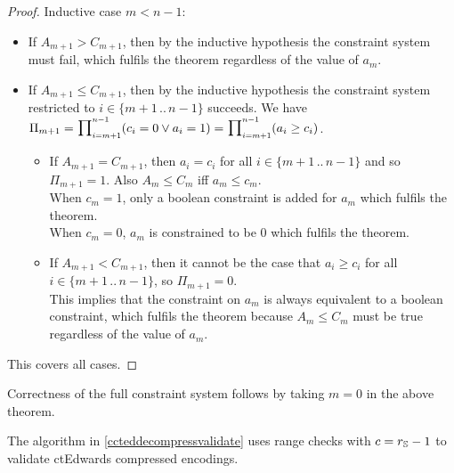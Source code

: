 \documentclass{article}
\newcommand{\crossref}[1]{\autoref{#1}}
\newcommand{\setof}[1]{\{{#1}\}}
\newcommand{\barerange}[2]{{{#1}\,..\,{#2}}}
\newcommand{\range}[2]{\setof{\barerange{#1}{#2}}}
\newcommand{\sop}[3]{\!\scalebox{0.89}{$\scalebox{1.404}{$\strut#3$}_{#1}^{#2}$}}
\newcommand{\sproduct}[2]{\sop{#1}{#2}{\prod}}
\newcommand{\ParamS}[1]{{{#1}_\mathbb{\hskip 0.03em S}}}
\begin{document}
\begin{proof}
Inductive case $m < n-1$:
\begin{itemize}
  \item If $A_{m+1} > C_{m+1}$, then by the inductive hypothesis the constraint system
        must fail, which fulfils the theorem regardless of the value of $a_m$.
  \item If $A_{m+1} \leq C_{m+1}$, then by the inductive hypothesis the constraint system
        restricted to $i \in \range{m+1}{n-1}$ succeeds. We have
        $\Pi_{m+1} =
        \sproduct{i=m+1}{n-1} (c_i = 0 \lor a_i = 1) =
        \sproduct{i=m+1}{n-1} (a_i \geq c_i)$.
        \begin{itemize}
          \item If $A_{m+1} = C_{m+1}$, then $a_i = c_i$ for all $i \in \range{m+1}{n-1}$ and
                so $\Pi_{m+1} = 1$.
                Also $A_m \leq C_m$ iff $a_m \leq c_m$. \\
                When $c_m = 1$, only a boolean constraint is added for $a_m$ which fulfils the theorem. \\
                When $c_m = 0$, $a_m$ is constrained to be $0$ which fulfils the theorem.
          \item If $A_{m+1} < C_{m+1}$, then it cannot be the case that $a_i \geq c_i$
                for all $i \in \range{m+1}{n-1}$, so $\Pi_{m+1} = 0$. \\
                This implies that the constraint on $a_m$ is always equivalent to
                a boolean constraint, which fulfils the theorem because $A_m \leq C_m$ must
                be true regardless of the value of $a_m$.
        \end{itemize}
\end{itemize}
\vspace{-2ex}
This covers all cases.
\end{proof}

\vspace{-2ex}
Correctness of the full constraint system follows by taking $m = 0$ in the above theorem.

\vspace{1ex}
The algorithm in \crossref{ccteddecompressvalidate} uses range checks with
$c = \ParamS{r}-1$ to validate ctEdwards compressed encodings.
\end{document}

